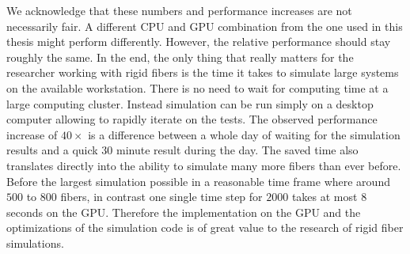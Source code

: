 We acknowledge that these numbers and performance increases are not necessarily fair. A different CPU and GPU combination from the one used in this thesis might perform differently. However, the relative performance should stay roughly the same. In the end, the only thing that really matters for the researcher working with rigid fibers is the time it takes to simulate large systems on the available workstation. There is no need to wait for computing time at a large computing cluster. Instead simulation can be run simply on a desktop computer allowing to rapidly iterate on the tests. The observed performance increase of $40×$ is a difference between a whole day of waiting for the simulation results and a quick $30$ minute result during the day. The saved time also translates directly into the ability to simulate many more fibers than ever before. Before the largest simulation possible in a reasonable time frame where around $500$ to $800$ fibers, in contrast one single time step for $2000$ takes at most $8$ seconds on the GPU. Therefore the implementation on the GPU and the optimizations of the simulation code is of great value to the research of rigid fiber simulations.

